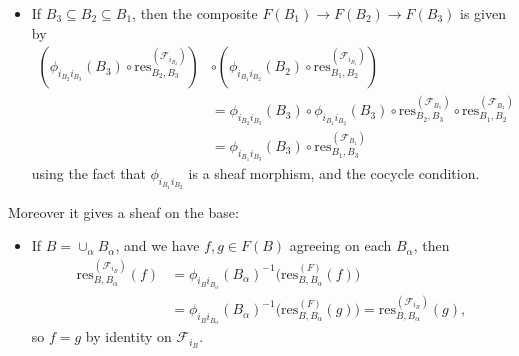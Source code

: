 \documentclass{report}
\newcommand{\res}{{\mathrm{res}}} %
\newcommand{\scrF}{\mathscr{F}}
\begin{document}
\begin{enumerate}[label=\textbf{2.5.\Alph*.}]
\begin{itemize}
		      \item If $B_3\subseteq B_2\subseteq B_1$, then the composite
		            $F(B_1)\to F(B_2)\to F(B_3)$ is given by
		            \begin{align*}
			            \left(
			            \phi_{i_{B_2}i_{B_3}}(B_3)
			            \circ\res^{(\scrF_{i_{B_2}})}_{B_2,B_3}
			            \right) & \circ\left(
			            \phi_{i_{B_1}i_{B_2}}(B_2)
			            \circ\res^{(\scrF_{i_{B_1}})}_{B_1,B_2}
			            \right)                             \\
			                    & =
			            \phi_{i_{B_2}i_{B_3}}(B_3)
			            \circ\phi_{i_{B_1}i_{B_2}}(B_3)
			            \circ\res^{(\scrF_{B_1})}_{B_2,B_3}
			            \circ\res^{(\scrF_{B_1})}_{B_1,B_2} \\
			                    & =
			            \phi_{i_{B_1}i_{B_3}}(B_3)
			            \circ\res^{(\scrF_{B_1})}_{B_1,B_3}
		            \end{align*}
		            using the fact that $\phi_{i_{B_1}i_{B_2}}$ is a sheaf morphism,
		            and the cocycle condition.
	      \end{itemize}
	      Moreover it gives a sheaf on the base:
	      \begin{itemize}
		      \item If $B=\cup_\alpha B_\alpha$, and we have $f,g\in F(B)$
		            agreeing on each $B_\alpha$, then
		            \begin{align*}
			            \res^{(\scrF_{i_B})}_{B,B_\alpha}(f)
			             & = \phi_{i_Bi_{B_\alpha}}(B_\alpha)^{-1}\bigl(
			            \res^{(F)}_{B,B_\alpha}(f)\bigr)                 \\
			             & = \phi_{i_Bi_{B_\alpha}}(B_\alpha)^{-1}\bigl(
			            \res^{(F)}_{B,B_\alpha}(g)\bigr)
			            = \res^{(\scrF_{i_B})}_{B,B_\alpha}(g),
		            \end{align*}
		            so $f=g$ by identity on $\scrF_{i_B}$.


\end{itemize}
\end{enumerate}
\end{document}
